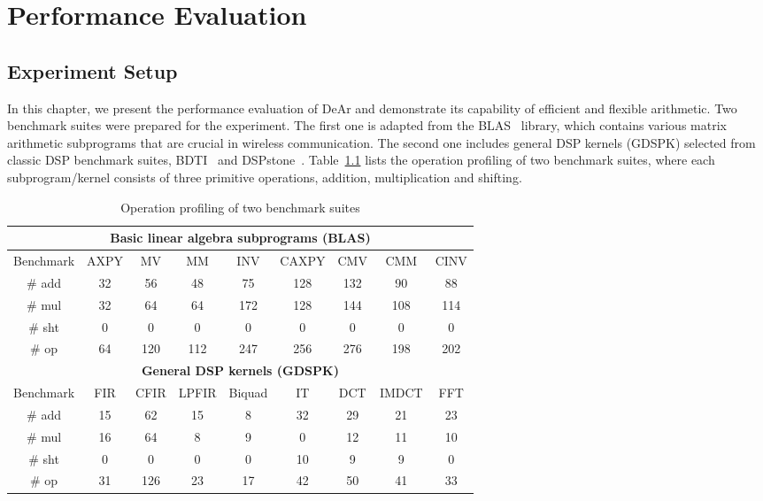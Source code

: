 \chapter{Performance Evaluation}
\section{Experiment Setup}
\label{sec:evaluation:setup}
In this chapter, we present the performance evaluation of DeAr and demonstrate its capability of efficient and flexible arithmetic.
Two benchmark suites were prepared for the experiment.
The first one is adapted from the BLAS~\cite{blas} library, 
which contains various matrix arithmetic subprograms that are crucial in wireless communication.
The second one includes general DSP kernels (GDSPK) selected from classic DSP benchmark suites, BDTI~\cite{bdti} and DSPstone~\cite{dspstone}.
Table~\ref{tab:op} lists the operation profiling of two benchmark suites, 
where each subprogram/kernel consists of three primitive operations, addition, multiplication and shifting.
\begin{table}[!ht]
    \centering
    \caption{Operation profiling of two benchmark suites}
    \label{tab:op}
    \resizebox{\columnwidth}{!}
    {
        \begin{tabular}{|c|c|c|c|c|c|c|c|c|}
            \hline
            \multicolumn{9}{|c|}{\textbf{Basic linear algebra subprograms (BLAS)}} \\ \hline
            Benchmark              & AXPY   & MV     & MM      & INV      & CAXPY  & CMV  & CMM    & CINV  \\ \hline
            \# add            &  32    &  56    &   48    &    75    &  128   & 132  &   90   &  88   \\ \hline
            \# mul            &  32    &  64    &   64    &   172    &  128   & 144  &  108   & 114   \\ \hline
            \# sht            &   0    &   0    &    0    &     0    &    0   &   0  &    0   &   0   \\ \hline
            \# op             &  64    & 120    &  112    &   247    &  256   & 276  &  198   & 202   \\ \hline
            \multicolumn{9}{|c|}{\textbf{General DSP kernels (GDSPK)}}                     \\ \hline
            Benchmark              & FIR    & CFIR   & LPFIR   & Biquad   & IT     & DCT  & IMDCT  & FFT   \\ \hline
            \# add            & 15     &  62    &   15    &    8     &  32    &  29  &   21   &  23   \\ \hline
            \# mul            & 16     &  64    &    8    &    9     &   0    &  12  &   11   &  10   \\ \hline
            \# sht            &  0     &   0    &    0    &    0     &  10    &   9  &    9   &   0   \\ \hline
            \# op             & 31     & 126    &   23    &   17     &  42    &  50  &   41   &  33   \\ \hline
        \end{tabular}
    }
\end{table}
